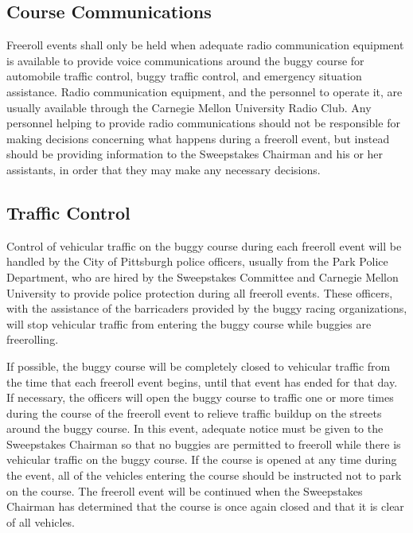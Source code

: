 \subsection{Course Communications}

	Freeroll events shall only be held when adequate radio communication
	equipment is available to provide voice communications around the buggy course
	for automobile traffic control, buggy traffic control, and emergency situation
	assistance. Radio communication equipment, and the personnel to operate it, are
	usually available through the Carnegie Mellon University Radio Club. Any
	personnel helping to provide radio communications should not be responsible for
	making decisions concerning what happens during a freeroll event, but
	instead should be providing information to the Sweepstakes Chairman and his or
	her assistants, in order that they may make any necessary decisions.
	
	
\subsection{Traffic Control}

	Control of vehicular traffic on the buggy course during each freeroll event
	will be handled by the City of Pittsburgh police officers, usually from
	the Park Police Department, who are hired by the Sweepstakes Committee and
	Carnegie Mellon University to provide police protection during all freeroll
	events. These officers, with the assistance of the barricaders provided
	by the buggy racing organizations, will stop vehicular traffic from entering
	the buggy course while buggies are freerolling.

	If possible, the buggy course will be completely closed to vehicular traffic
	from the time that each freeroll event begins, until that event
	has ended for that day. If necessary, the officers will open the buggy course
	to traffic one or more times during the course of the freeroll event
	to relieve traffic buildup on the streets around the buggy course. In this
	event, adequate notice must be given to the Sweepstakes Chairman so that no
	buggies are permitted to freeroll while there is vehicular traffic on the buggy
	course. If the course is opened at any time during the event, all of
	the vehicles entering the course should be instructed not to park on the
	course. The freeroll event will be continued when the Sweepstakes Chairman has
	determined that the course is once again closed and that it is clear of all
	vehicles.
	
